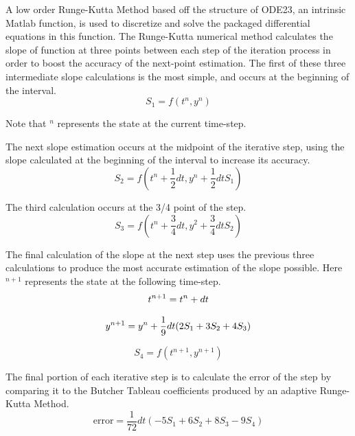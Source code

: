 \documentclass[letterpaper, twoside]{article}
\numberwithin{equation}{section}
\begin{document}
A low order Runge-Kutta Method based off the structure of ODE23, an intrinsic Matlab function, is used to discretize and solve the packaged differential equations in this function. The Runge-Kutta numerical method calculates the slope of function at three points between each step of the iteration process in order to boost the accuracy of the next-point estimation. The first of these three intermediate slope calculations is the most simple, and occurs at the beginning of the interval.
\begin{equation} \label{eq: S_1}
  S_1 = f(t^n,y^n)
\end{equation}

Note that $^n$ represents the state at the current time-step.

The next slope estimation occurs at the midpoint of the iterative step, using the slope calculated at the beginning of the interval to increase its accuracy.
\begin{equation} \label{eq: S_2}
  S_2 = f(t^n + \frac{1}{2} dt,y^n + \frac{1}{2} dt S_1)
\end{equation}

The third calculation occurs at the 3/4  point of the step.
\begin{equation} \label{eq: S_3}
  S_3 = f(t^n + \frac{3}{4} dt,y^2+\frac{3}{4} dt S_2)
\end{equation}

The final calculation of the slope at the next step uses the previous three calculations to produce the most accurate estimation of the slope possible. Here $^{n+1}$ represents the state at the following time-step.
\begin{equation} \label{eq: t_{new}}
  t^{n+1} = t^n + dt
\end{equation}

\begin{equation} \label{eq: y_{new}}
  y^{n+1} = y^n + \frac{1}{9} dt (2 S_1 + 3 S_2 + 4 S_3)
\end{equation}

\begin{equation} \label{eq: S_4}
  S_4 = f(t^{n+1},y^{n+1})
\end{equation}

The final portion of each iterative step is to calculate the error of the step by comparing it to the Butcher Tableau coefficients produced by an adaptive Runge-Kutta Method.
\begin{equation} \label{eq: errorfunction}
  \mathrm{error} = \frac{1}{72} dt (-5 S_1 + 6 S_2 + 8 S_3 - 9 S_4)
\end{equation}
\end{document}
